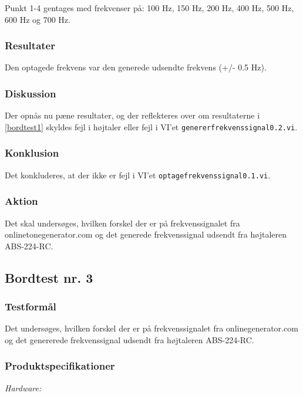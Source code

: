 			Punkt 1-4 gentages med frekvenser på: 100 Hz, 150 Hz, 200 Hz, 400 Hz, 500 Hz, 600 Hz og 700 Hz. 
			
			\subsubsection{Resultater}
			Den optagede frekvens var den generede udsendte frekvens (+/- 0.5 Hz). 
			\subsubsection{Diskussion}
			Der opnås nu pæne resultater, og der reflekteres over om resultaterne i \ref{bordtest1} skyldes fejl i højtaler eller fejl i VI'et \texttt{genererfrekvenssignal0.2.vi}. 
			\subsubsection{Konklusion}
			Det konkluderes, at der ikke er fejl i VI'et \texttt{optagefrekvenssignal0.1.vi}. 
			\subsubsection{Aktion}
			Det skal undersøges, hvilken forskel der er på frekvenssignalet fra onlinetonegenerator.com og det generede frekvenssignal udsendt fra højtaleren ABS-224-RC.  
	
		\subsection{Bordtest nr. 3} %
		\subsubsection{Testformål}
		Det undersøges, hvilken forskel der er på frekvenssignalet fra onlinegenerator.com og det genererede frekvenssignal udsendt fra højtaleren ABS-224-RC.  
		
		\subsubsection{Produktspecifikationer}
		
		\textit{Hardware:}\\
		\\
		\\
		\pins\\
		\krympeflex
		\arduino\\
		\usbkabel\\
		\PC\\
		\mikrofon\\
	
